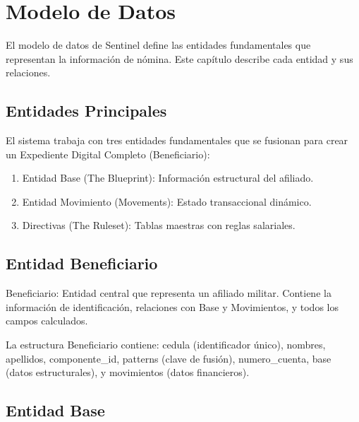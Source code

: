 \chapter{Modelo de Datos}

\bigskip

El modelo de datos de Sentinel define las entidades fundamentales que representan la información de nómina. Este capítulo describe cada entidad y sus relaciones.

\bigskip

\section{Entidades Principales}

El sistema trabaja con tres entidades fundamentales que se fusionan para crear un Expediente Digital Completo (Beneficiario):

\bigskip

\begin{enumerate}
    \item Entidad Base (The Blueprint): Información estructural del afiliado.
    \item Entidad Movimiento (Movements): Estado transaccional dinámico.
    \item Directivas (The Ruleset): Tablas maestras con reglas salariales.
\end{enumerate}

\bigskip

\section{Entidad Beneficiario}

Beneficiario: Entidad central que representa un afiliado militar. Contiene la información de identificación, relaciones con Base y Movimientos, y todos los campos calculados.

\bigskip

La estructura Beneficiario contiene: cedula (identificador único), nombres, apellidos, componente\_id, patterns (clave de fusión), numero\_cuenta, base (datos estructurales), y movimientos (datos financieros).

\bigskip

\section{Entidad Base}

